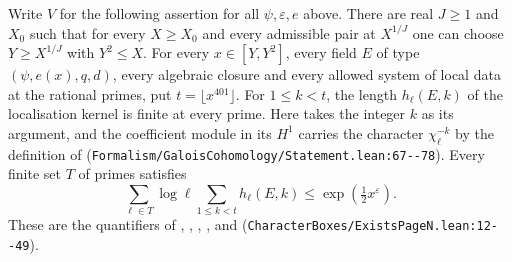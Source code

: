 Write $V$ for the following assertion for all $\psi,\varepsilon,e$ above. There are real $J\ge1$ and $X_0$ such that for every $X\ge X_0$ and every admissible pair at $X^{1/J}$ one can choose $Y\ge X^{1/J}$ with $Y^2\le X$. For every $x\in[Y,Y^2]$, every field $E$ of type $(\psi,e(x),q,d)$, every algebraic closure and every allowed system of local data at the rational primes, put $t=\lfloor x^{401}\rfloor$. For $1\le k<t$, the length $h_\ell(E,k)$ of the localisation kernel is finite at every prime. Here  takes the integer $k$ as its argument, and the coefficient module in its $H^1$ carries the character $\chi_\ell^{-k}$ by the definition of  (\nolinkurl{Formalism/GaloisCohomology/Statement.lean:67--78}). Every finite set $T$ of primes satisfies
\[
 \sum_{\ell\in T}\log\ell\sum_{1\le k<t}h_\ell(E,k)\le \exp(\tfrac12 x^\varepsilon).
\]
These are the quantifiers of , , , ,  and  (\nolinkurl{CharacterBoxes/ExistsPageN.lean:12--49}).
